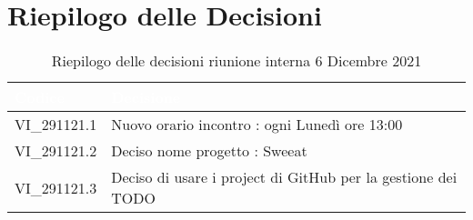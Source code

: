 \section{Riepilogo delle Decisioni}


\begin{table}[!htbp]
\renewcommand{\arraystretch}{1.5}
\begin{tabular}{m{}<{\centering}  m{}<{\centering}}
\rowcolor{darkblue} \textcolor{white}{\textbf{Codice}} & \textcolor{white}{\textbf{Decisione}} \\
\hline
VI\_291121.1 & Nuovo orario incontro : ogni Lunedì ore 13:00 \\
\rowcolor{gray!10} VI\_291121.2 & Deciso nome progetto : Sweeat \\
VI\_291121.3 & Deciso di usare i project di GitHub per la gestione dei TODO\\
\end{tabular}
\caption{Riepilogo delle decisioni riunione interna 6 Dicembre 2021}
\end{table}